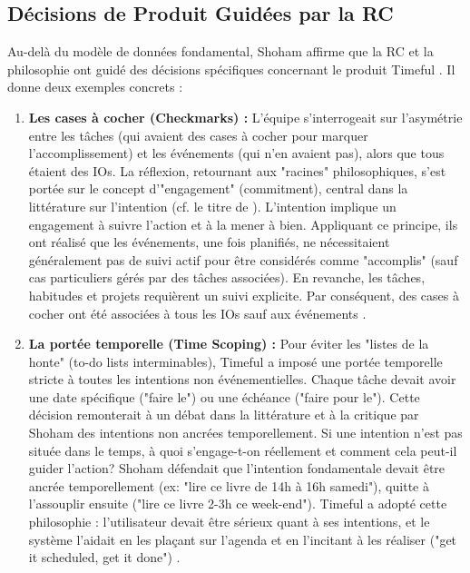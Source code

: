 \documentclass[11pt,a4paper]{article}
\begin{document}
\subsection{Décisions de Produit Guidées par la RC}

Au-delà du modèle de données fondamental, Shoham affirme que la RC et la philosophie ont guidé des décisions spécifiques concernant le produit Timeful \citep{Shoham2015Why}. Il donne deux exemples concrets :

\begin{enumerate}
    \item \textbf{Les cases à cocher (Checkmarks) :} L'équipe s'interrogeait sur l'asymétrie entre les tâches (qui avaient des cases à cocher pour marquer l'accomplissement) et les événements (qui n'en avaient pas), alors que tous étaient des IOs. La réflexion, retournant aux "racines" philosophiques, s'est portée sur le concept d'"engagement" (commitment), central dans la littérature sur l'intention (cf. le titre de \citet{Cohen1990Intention}). L'intention implique un engagement à suivre l'action et à la mener à bien. Appliquant ce principe, ils ont réalisé que les événements, une fois planifiés, ne nécessitaient généralement pas de suivi actif pour être considérés comme "accomplis" (sauf cas particuliers gérés par des tâches associées). En revanche, les tâches, habitudes et projets requièrent un suivi explicite. Par conséquent, des cases à cocher ont été associées à tous les IOs sauf aux événements \citep{Shoham2015Why}.

    \item \textbf{La portée temporelle (Time Scoping) :} Pour éviter les "listes de la honte" (to-do lists interminables), Timeful a imposé une portée temporelle stricte à toutes les intentions non événementielles. Chaque tâche devait avoir une date spécifique ("faire le") ou une échéance ("faire pour le"). Cette décision remonterait à un débat dans la littérature et à la critique par Shoham \citep{Shoham2009Logics} des intentions non ancrées temporellement. Si une intention n'est pas située dans le temps, à quoi s'engage-t-on réellement et comment cela peut-il guider l'action? Shoham défendait que l'intention fondamentale devait être ancrée temporellement (ex: "lire ce livre de 14h à 16h samedi"), quitte à l'assouplir ensuite ("lire ce livre 2-3h ce week-end"). Timeful a adopté cette philosophie : l'utilisateur devait être sérieux quant à ses intentions, et le système l'aidait en les plaçant sur l'agenda et en l'incitant à les réaliser ("get it scheduled, get it done") \citep{Shoham2015Why}.
\end{enumerate}
\end{document}
